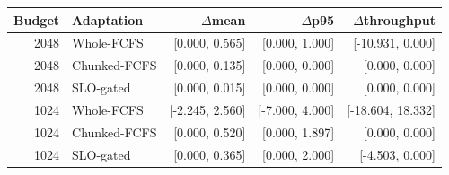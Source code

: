 \begin{tabular}{@{}rlrrr@{}}\toprule
Budget & Adaptation & $\Delta$mean & $\Delta$p95 & $\Delta$throughput \\ \midrule
2048 & Whole-FCFS & [0.000, 0.565] & [0.000, 1.000] & [-10.931, 0.000] \\
2048 & Chunked-FCFS & [0.000, 0.135] & [0.000, 0.000] & [0.000, 0.000] \\
2048 & SLO-gated & [0.000, 0.015] & [0.000, 0.000] & [0.000, 0.000] \\
1024 & Whole-FCFS & [-2.245, 2.560] & [-7.000, 4.000] & [-18.604, 18.332] \\
1024 & Chunked-FCFS & [0.000, 0.520] & [0.000, 1.897] & [0.000, 0.000] \\
1024 & SLO-gated & [0.000, 0.365] & [0.000, 2.000] & [-4.503, 0.000] \\
\bottomrule\end{tabular}

